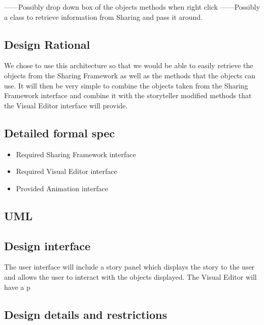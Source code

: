 \documentclass[12pt]{article}
\begin{document}


------Possibly drop down box of the objects methods when right click
------Possibly a class to retrieve information from Sharing and pass it around.

\subsection{Design Rational}
We chose to use this architecture so that we would be able to easily retrieve the objects from the Sharing Framework as well as the methods that the objects can use.  It will then be very simple to combine the objects taken from the Sharing Framework interface and combine it with the storyteller modified methods that the Visual Editor interface will provide.  

\subsection{Detailed formal spec}
\begin{itemize}
	\item Required Sharing Framework interface
	\item Required Visual Editor interface
	\item Provided Animation interface
\end{itemize}
\subsection{UML}

\subsection{Design interface}
The user interface will include a story panel which displays the story to the user and allows the user to interact with the objects displayed.  The Visual Editor will have a p


\subsection{Design details and restrictions}


\end{document}
